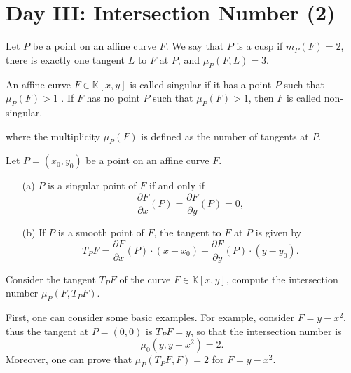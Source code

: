 \documentclass[10pt]{article}
\begin{document}
\section{Day III: Intersection Number (2)}

\begin{definition}[Cusps]
  Let \( P \) be a point on an affine curve \( F \). We say that \( P \) is a cusp if \( m_P(F) = 2 \), there is exactly one tangent \( L \) to \( F \) at \( P \), and \( \mu_P(F,L) = 3 \).
\end{definition}

\begin{definition}
  An affine curve $ F \in \mathbb{K}[x,y]$ is called singular if it has a point $ P$ such that $ \mu_{P}(F) > 1$ . If $ F$ has no point $ P$ such that $ \mu_{P}(F) > 1$, then $ F$ is called non-singular.
\end{definition}
where the multiplicity $ \mu_{P}(F)$ is defined as the number of tangents at $ P$.
\begin{proposition}
  Let \( P = (x_0, y_0) \) be a point on an affine curve \( F \).
  \begin{enumerate}
    \item[(a)] \( P \) is a singular point of \( F \) if and only if
      \begin{equation*}
        \frac{\partial F}{\partial x}(P) = \frac{\partial F}{\partial y}(P) = 0,
      \end{equation*}
    \item[(b)] If \( P \) is a smooth point of \( F \), the tangent to \( F \) at \( P \) is given by
      \begin{equation*}
        T_P F = \frac{\partial F}{\partial x}(P) \cdot (x - x_0) + \frac{\partial F}{\partial y}(P) \cdot (y - y_0).
      \end{equation*}
  \end{enumerate}
\end{proposition}

\begin{example}
  Consider the tangent $ T_{P}F$ of the curve $ F \in \mathbb{K}[x,y]$, compute the intersection number $ \mu_{P}(F,T_{P}F)$.
\end{example}
\begin{solution}
  First, one can consider some basic examples. For example, consider $ F = y - x^{2}$, thus the tangent at $ P = (0,0)$ is $ T_{P}F = y$, so that the intersection number is
  \begin{equation*}
    \mu_{0}(y, y - x^{2}) = 2.
  \end{equation*}
  Moreover, one can prove that $ \mu_{P}(T_{P}F, F) = 2$ for $ F = y - x^{2}$.
\end{solution}
\end{document}
